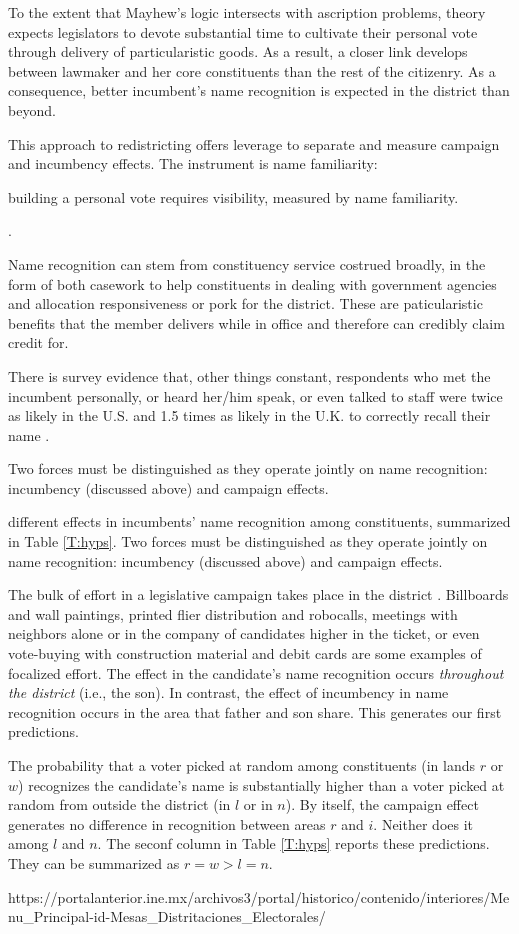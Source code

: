 To the extent that Mayhew's logic intersects with ascription problems, theory expects legislators to devote substantial time to cultivate their personal vote through delivery of particularistic goods. As a result, a closer link develops between lawmaker and her core constituents than the rest of the citizenry. As a consequence, better incumbent's name recognition is expected in the district than beyond. 



This approach to redistricting offers leverage to separate and measure campaign and incumbency effects. The instrument is name familiarity:

building a personal vote requires visibility, measured by name familiarity. 


.

Name recognition can stem from constituency service costrued broadly, in the form of both casework to help constituents in dealing with government agencies and allocation responsiveness or pork for the district. These are paticularistic benefits that the member delivers while in office and therefore can credibly claim credit for.

There is survey evidence that, other things constant, respondents who met the incumbent personally, or heard her/him speak, or even talked to staff were twice as likely in the U.S. and 1.5 times as likely in the U.K. to correctly recall their name \citep[][:34]{cain.etal.1987}.  

Two forces must be distinguished as they operate jointly on name recognition: incumbency (discussed above) and campaign effects.

different effects in incumbents' name recognition among constituents, summarized in Table \ref{T:hyps}. Two forces must be distinguished as they operate jointly on name recognition: incumbency (discussed above) and campaign effects.

The bulk of effort in a legislative campaign takes place in the district \citep{langston.nd}. Billboards and wall paintings, printed flier distribution and robocalls, meetings with neighbors alone or in the company of candidates higher in the ticket, or even vote-buying with construction material and debit cards are some examples of focalized effort. The effect in the candidate's name recognition occurs \emph{throughout the district} (i.e., the son). In contrast, the effect of incumbency in name recognition occurs in the area that father and son share. This generates our first predictions.

The probability that a voter picked at random among constituents (in lands $r$ or $w$) recognizes the candidate's name is substantially higher than a voter picked at random from outside the district (in $l$ or in $n$). By itself, the campaign effect generates no difference in recognition between areas $r$ and $i$. Neither does it among $l$ and $n$. The seconf column in Table \ref{T:hyps} reports these predictions. They can be summarized as $r=w>l=n$. 




 

https://portalanterior.ine.mx/archivos3/portal/historico/contenido/interiores/Menu_Principal-id-Mesas_Distritaciones_Electorales/
